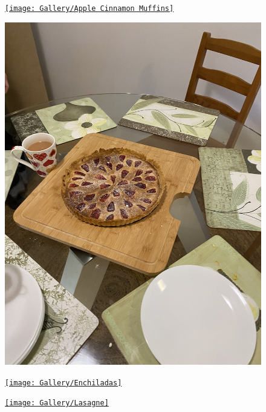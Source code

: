 \documentclass[]{article}
\begin{document}
\newpage\begin{figure}[H]
\begin{center}\hyperref[rec:Apple Cinnamon Muffins]{\texttt{[image: Gallery/Apple Cinnamon Muffins]}}\caption*{}\label{fig:Apple Cinnamon Muffins}\end{center}
\end{figure}
\newpage\begin{figure}[H]
\begin{center}\hyperref[rec:Strawberry Flan]{\includegraphics[keepaspectratio,width=\textheight,height=\textwidth,angle=-90]{Gallery/Strawberry Flan}}\caption*{}\label{fig:Strawberry Flan}\end{center}
\end{figure}
\newpage\begin{figure}[H]
\begin{center}\hyperref[rec:Enchiladas]{\texttt{[image: Gallery/Enchiladas]}}\caption*{}\label{fig:Enchiladas}\end{center}
\end{figure}
\newpage\begin{figure}[H]
\begin{center}\hyperref[rec:Lasagne]{\texttt{[image: Gallery/Lasagne]}}\caption*{}\label{fig:Lasagne}\end{center}
\end{figure}
\end{document}

